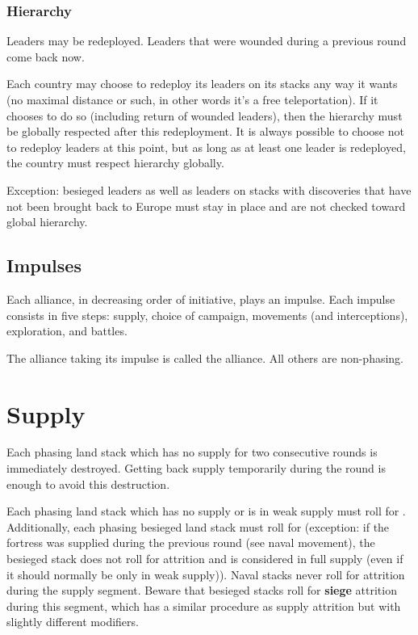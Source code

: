 \subsubsection{Hierarchy}
Leaders may be redeployed. Leaders that were wounded during a previous round
come back now.

Each country may choose to redeploy its leaders on its stacks any way it wants
(no maximal distance or such, in other words it's a free teleportation). If it
chooses to do so (including return of wounded leaders), then the hierarchy
must be globally respected after this redeployment. It is always possible to
choose not to redeploy leaders at this point, but as long as at least one
leader is redeployed, the country must respect hierarchy globally.

Exception: besieged leaders as well as leaders on stacks with discoveries that
have not been brought back to Europe must stay in place and are not checked
toward global hierarchy.

\subsection{Impulses}
Each alliance, in decreasing order of initiative, plays an impulse. Each
impulse consists in five steps: supply, choice of campaign, movements (and
interceptions), exploration, and battles.

The alliance taking its impulse is called the  alliance. All
others are non-phasing.


\section{Supply}
Each phasing land stack which has no supply for two consecutive rounds is
immediately destroyed. Getting back supply temporarily during the round is
enough to avoid this destruction.

Each phasing land stack which has no supply or is in weak supply must roll for
. Additionally, each phasing besieged land stack must
roll for  (exception: if the fortress was supplied
during the previous round (see naval movement), the besieged stack does not
roll for attrition and is considered in full supply (even if it should
normally be only in weak supply)). Naval stacks never roll for attrition
during the supply segment. Beware that besieged stacks roll for \textbf{siege}
attrition during this segment, which has a similar procedure as supply
attrition but with slightly different modifiers.

